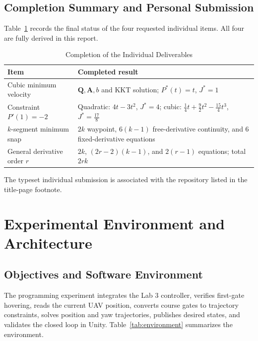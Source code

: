 \documentclass[letterpaper,10pt,conference]{IEEEtran}
\newcommand{\vect}[1]{\bm{#1}}
\begin{document}
\subsection{Completion Summary and Personal Submission}
Table~\ref{tab:individual-completion} records the final status of the four requested individual items. All four are fully derived in this report.
\begin{table}[!htbp]
\caption{Completion of the Individual Deliverables}
\label{tab:individual-completion}
\centering
\footnotesize
\begin{tabular}{@{}p{}p{}@{}}
\toprule
Item & Completed result\\
\midrule
Cubic minimum velocity & $\vect{Q},\vect{A},b$ and KKT solution; $P^*(t)=t$, $J^*=1$\\
Constraint $P'(1)=-2$ & Quadratic: $4t-3t^2$, $J^*=4$; cubic: $\frac14t+\frac92t^2-\frac{15}{4}t^3$, $J^*=\frac{17}{8}$\\
$k$-segment minimum snap & $2k$ waypoint, $6(k-1)$ free-derivative continuity, and $6$ fixed-derivative equations\\
General derivative order $r$ & $2k$, $(2r-2)(k-1)$, and $2(r-1)$ equations; total $2rk$\\
\bottomrule
\end{tabular}
\end{table}
The typeset individual submission is associated with the repository listed in the title-page footnote.

\section{Experimental Environment and Architecture}
\subsection{Objectives and Software Environment}
The programming experiment integrates the Lab 3 controller, verifies first-gate hovering, reads the current UAV position, converts course gates to trajectory constraints, solves position and yaw trajectories, publishes desired states, and validates the closed loop in Unity. Table~\ref{tab:environment} summarizes the environment.
\end{document}
